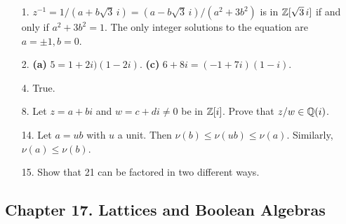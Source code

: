 {\small
\begin{itemize}
 
\bf\item[1.]\rm
$z^{-1} = 1/(a + b\sqrt{3}\, i) = (a -b \sqrt{3}\, i)/(a^2 + 3b^2)$ is in
${\Bbb Z}[\sqrt{3}\, i]$ if and only if $a^2 + 3 b^2 = 1$.  The only
integer solutions to the equation are $a = \pm 1, b = 0$.

 
\bf\item[2.]\rm
{\bf (a)} $5 = 1 + 2i)(1 -2i)$.
{\bf (c)} $6 + 8i = (-1+7i)(1-i)$.
 
\bf\item[4.]\rm
True.


\bf\item[8.]\rm
Let $z=a + bi$ and $w=c + di \neq 0$ be in ${\Bbb Z}[i]$. Prove that
$z/w \in {\Bbb Q}(i)$.



 
\bf\item[14.]\rm
Let $a = ub$ with $u$ a unit. Then $\nu(b) \leq \nu(ub) \leq \nu(a)$.
Similarly, $\nu(a) \leq \nu(b)$.
 

\bf\item[15.]\rm
Show that 21 can be factored in two different ways.



\end{itemize}
}
 
\subsection*{Chapter 17. Lattices and Boolean Algebras}
 
